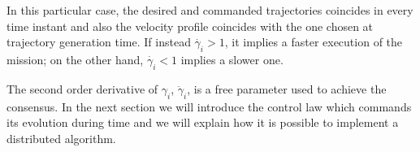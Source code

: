 In this particular case, the desired and commanded trajectories coincides
in every time instant and also the velocity profile coincides with the one
chosen at trajectory generation time.
If instead $\dot{\gamma_i} > 1$, it implies a faster execution of the mission;
on the other hand, $\dot{\gamma_i} < 1$ implies a slower one.

The second order derivative of $\gamma_i$, $\ddot{\gamma}_i$, is a free parameter
used to achieve the consensus. In the next section we will introduce the control law
which commands its evolution during time and we will explain how it is possible to
implement a distributed algorithm.

